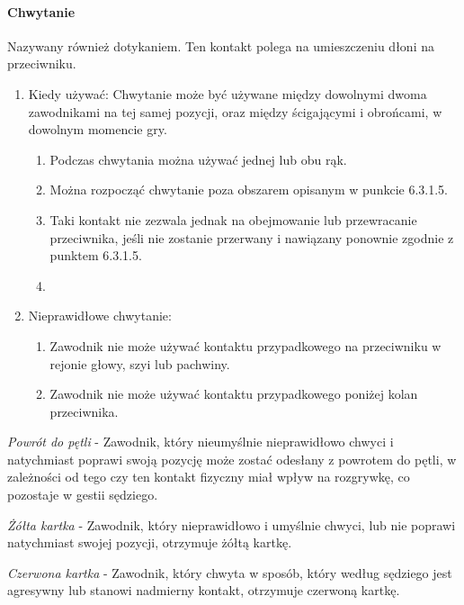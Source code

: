 \documentclass[12pt]{article}
\begin{document}
\paragraph{Chwytanie}
Nazywany również dotykaniem. Ten kontakt
polega na umieszczeniu dłoni na przeciwniku.

\begin{enumerate}
	\item
	      Kiedy używać: Chwytanie może być używane między dowolnymi dwoma
	      zawodnikami na tej samej pozycji, oraz między ścigającymi i obrońcami,
	      w dowolnym momencie gry.

	      \begin{enumerate}
		      \item
		            Podczas chwytania można używać jednej lub obu rąk.
		      \item
		            Można rozpocząć chwytanie poza obszarem opisanym w punkcie
		            6.3.1.5.\item Taki kontakt nie zezwala jednak na obejmowanie lub
		            przewracanie przeciwnika, jeśli nie zostanie przerwany i nawiązany
		            ponownie zgodnie z punktem 6.3.1.5.\item
	      \end{enumerate}
	\item
	      Nieprawidłowe chwytanie:

	      \begin{enumerate}
		      \item
		            Zawodnik nie może używać kontaktu przypadkowego na przeciwniku w
		            rejonie głowy, szyi lub pachwiny.
		      \item
		            Zawodnik nie może używać kontaktu przypadkowego poniżej kolan
		            przeciwnika.
	      \end{enumerate}
\end{enumerate}

\emph{Powrót do pętli} - Zawodnik, który nieumyślnie nieprawidłowo
chwyci i natychmiast poprawi swoją pozycję może zostać odesłany z
powrotem do pętli, w zależności od tego czy ten kontakt fizyczny miał
wpływ na rozgrywkę, co pozostaje w gestii sędziego.

\emph{Żółta kartka} - Zawodnik, który nieprawidłowo i umyślnie chwyci,
lub nie poprawi natychmiast swojej pozycji, otrzymuje żółtą kartkę.

\emph{Czerwona kartka} - Zawodnik, który chwyta w sposób, który według
sędziego jest agresywny lub stanowi nadmierny kontakt, otrzymuje
czerwoną kartkę.
\end{document}

